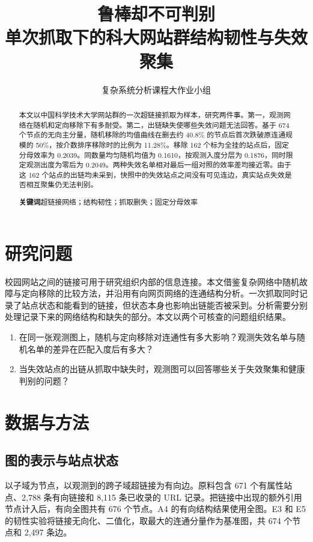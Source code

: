 \documentclass[11pt,a4paper]{ctexart}
\title{\textbf{鲁棒却不可判别}\\[4pt]
\large 单次抓取下的科大网站群结构韧性与失效聚集}
\author{复杂系统分析课程大作业小组}
\date{}
\begin{document}
\maketitle

\begin{abstract}
本文以中国科学技术大学网站群的一次超链接抓取为样本，研究两件事。第一，观测网络在随机和定向移除下有多耐受。第二，出链缺失使哪些失效问题无法回答。基于 674 个节点的无向主分量，随机移除的均值曲线在删去约 40.8\% 的节点后首次跌破原连通规模的 50\%，按介数排序移除时的比例为 11.28\%。移除 162 个标为全挂的站点后，固定分母效率为 0.2039。同数量均匀随机均值为 0.1610，按观测入度分层为 0.1876，同时限定观测出度为零后为 0.2049。两种失效名单相对最后一组对照的效率差均接近零。由于这 162 个站点的出链均未采到，快照中的失效站点之间没有可见连边，真实站点失效是否相互聚集仍无法判别。

\noindent\textbf{关键词}\quad 超链接网络；结构韧性；抓取删失；固定分母效率
\end{abstract}

\section{研究问题}

校园网站之间的链接可用于研究组织内部的信息连接。本文借鉴复杂网络中随机故障与定向移除的比较方法\cite{albert2000}，并沿用有向网页网络的连通结构分析\cite{broder2000}。一次抓取同时记录了站点状态和能看到的链接，但状态本身也影响出链能否被采到。分析需要分别处理记录下来的网络结构和缺失的部分。本文以两个可核查的问题组织结果。

\begin{enumerate}
  \item 在同一张观测图上，随机与定向移除对连通性有多大影响？观测失效名单与随机名单的差异在匹配入度后有多大？
  \item 当失效站点的出链从抓取中缺失时，观测图可以回答哪些关于失效聚集和健康判别的问题？
\end{enumerate}

\section{数据与方法}

\subsection{图的表示与站点状态}

以子域为节点，以观测到的跨子域超链接为有向边。原料包含 671 个有属性站点、2,788 条有向链接和 8,115 条已收录的 URL 记录。把链接中出现的额外引用节点计入后，有向全图共有 676 个节点。A4 的有向结构结果使用全图。E3 和 E5 的韧性实验将链接无向化、二值化，取最大的连通分量作为基准图，共 674 个节点和 2,497 条边。
\end{document}
